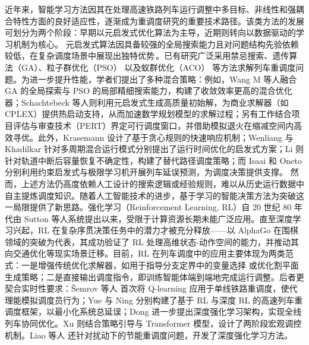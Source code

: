 近年来，智能学习方法因其在处理高速铁路列车运行调整中多目标、非线性和强耦合特性方面的良好适应性，逐渐成为重调度研究的重要技术路径。该类方法的发展可划分为两个阶段：早期以元启发式优化算法为主导，近期则转向以数据驱动的学习机制为核心。
元启发式算法因具备较强的全局搜索能力且对问题结构先验依赖较低，在复杂调度场景中展现出独特优势 \cite{Cuevas2023}。已有研究广泛采用禁忌搜索\cite{Corman2010}、遗传算法（GA）\cite{WangR2023}、粒子群优化（PSO）\cite{WangR2023,Hassannayebi2018} 以及蚁群优化（ACO）\cite{ZhouXZ2018,Behiri2023} 等方法求解列车重调度问题。为进一步提升性能，学者们提出了多种混合策略：例如，Wang M 等人融合 GA 的全局探索与 PSO 的局部精细搜索能力，构建了收敛效率更高的混合优化器\cite{WangM2019}；Schachtebeck 等人则利用元启发式生成高质量初始解，为商业求解器（如 CPLEX）提供热启动支持，从而加速数学规划模型的求解过程\cite{Schachtebeck2008}；另有工作结合项目评估与审查技术（PERT）界定可行调度窗口，并借助模拟退火在缩减空间内高效寻优\cite{Norio2005}。此外，Krasemann\cite{Krasemann2012} 设计了基于贪心规则的快速响应机制；Wenliang\cite{Wenliang2015} 与 Khadilkar\cite{Khadilkar2019} 针对多周期混合运行模式分别提出了运行时间优化的启发式方案；Li\cite{Li2014} 则针对轨道中断后容量恢复不确定性，构建了替代路径调度策略；而 Isaai\cite{Isaai2000} 和 Oneto\cite{Oneto2017} 分别利用约束启发式与极限学习机开展列车延误预测，为调度决策提供支撑。
然而，上述方法仍高度依赖人工设计的搜索逻辑或经验规则，难以从历史运行数据中自主提炼调度知识。随着人工智能技术的进步，基于学习的智能决策方法为突破这一局限提供了新思路。强化学习（Reinforcement Learning, RL）自 20 世纪 80 年代由 Sutton 等人系统提出以来，受限于计算资源长期未能广泛应用。直至深度学习兴起，RL 在复杂序贯决策任务中的潜力才被充分释放——以 AlphaGo 在围棋领域的突破为代表，其成功验证了 RL 处理高维状态-动作空间的能力，并推动其向交通优化等现实场景迁移\cite{Haydari2020,WangQ2021,Cao2020}。目前，RL 在列车调度中的应用主要体现为两类范式：一是增强传统优化求解器，如用于指导分支定界中的变量选择\cite{Qu2022} 或优化割平面生成策略\cite{Tang2020}；二是直接输出调度指令，即训练智能体端到端地完成运行调整。后者更契合实时性要求：Šemrov 等人\cite{semrov2016reinforcement} 首次将 Q-learning 应用于单线铁路重调度，使代理能模拟调度员行为；Yue\cite{Yue2023} 与 Ning\cite{Ning2019} 分别构建了基于 RL 与深度 RL 的高速列车重调度框架，以最小化系统总延误；Dong\cite{Dong2025} 进一步提出深度强化学习架构，实现全线列车协同优化。Xu\cite{Xu2023} 则结合策略引导与 Transformer 模型，设计了两阶段宏观调控机制。Liao 等人\cite{Liao2021} 还针对扰动下的节能重调度问题，开发了深度强化学习方法。



